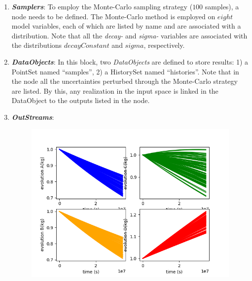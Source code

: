 \begin{enumerate}
   \item \textbf{\textit{Samplers}}:
      To employ the Monte-Carlo sampling strategy ($100$ samples), a
       node needs to be defined.  The
      Monte-Carlo method is employed on $eight$ model variables, each of which are listed by name
      and are associated with a distribution.
      Note that all the \textit{decay-\*} and
      \textit{sigma-\*} variables are associated with the distributions
      $decayConstant$ and $sigma$, respectively.
   \item \textbf{\textit{DataObjects}}:
      In this block, two \textit{DataObjects} are defined to store results: 1) a PointSet named
      ``samples'', 2) a HistorySet named ``histories''.
      Note that in the  node all the uncertainties
      perturbed through the Monte-Carlo strategy are listed. By this, any
      realization in the input space is linked in the DataObject to the outputs listed in the
       node.
   \item \textbf{\textit{OutStreams}}:
 \begin{figure}[h!]
  \centering
  \includegraphics[scale=0.7]{../../tests/framework/user_guide/ForwardSamplingStrategies/gold/RunDir/MonteCarlo/1-historyPlot_line-line-line-line.png}

\end{figure}
\end{enumerate}
